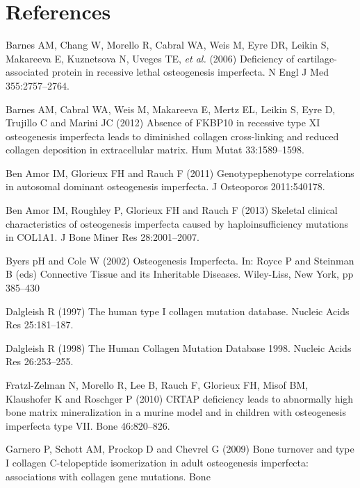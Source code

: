 \section*{References}
\par Barnes AM, Chang W, Morello R, Cabral WA, Weis M, Eyre DR, Leikin S,
                    Makareeva E, Kuznetsova N, Uveges TE, \textit{et al.} (2006) Deficiency
                    of cartilage-associated protein in recessive lethal osteogenesis imperfecta. N
                    Engl J Med 355:2757–2764.
\par Barnes AM, Cabral WA, Weis M, Makareeva E, Mertz EL, Leikin S, Eyre
                    D, Trujillo C and Marini JC (2012) Absence of FKBP10 in recessive type XI
                    osteogenesis imperfecta leads to diminished collagen cross-linking and reduced
                    collagen deposition in extracellular matrix. Hum Mutat
                    33:1589–1598.
\par Ben Amor IM, Glorieux FH and Rauch F (2011) Genotypephenotype
                    correlations in autosomal dominant osteogenesis imperfecta. J Osteoporos
                    2011:540178.
\par Ben Amor IM, Roughley P, Glorieux FH and Rauch F (2013) Skeletal
                    clinical characteristics of osteogenesis imperfecta caused by haploinsufficiency
                    mutations in COL1A1. J Bone Miner Res 28:2001–2007.
\par Byers pH and Cole W (2002) Osteogenesis Imperfecta. In: Royce P and
                    Steinman B (eds) Connective Tissue and its Inheritable Diseases. Wiley-Liss, New
                    York, pp 385–430
\par Dalgleish R (1997) The human type I collagen mutation database.
                    Nucleic Acids Res 25:181–187.
\par Dalgleish R (1998) The Human Collagen Mutation Database 1998.
                    Nucleic Acids Res 26:253–255.
\par Fratzl-Zelman N, Morello R, Lee B, Rauch F, Glorieux FH, Misof BM,
                    Klaushofer K and Roschger P (2010) CRTAP deficiency leads to abnormally high
                    bone matrix mineralization in a murine model and in children with osteogenesis
                    imperfecta type VII. Bone 46:820–826.
\par Garnero P, Schott AM, Prockop D and Chevrel G (2009) Bone turnover
                    and type I collagen C-telopeptide isomerization in adult osteogenesis
                    imperfecta: associations with collagen gene mutations. Bone
